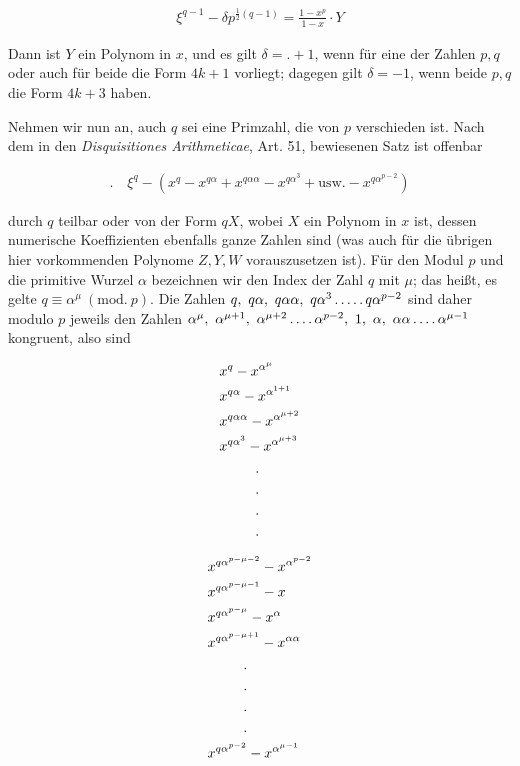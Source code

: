 \[
\begin{aligned}
\xi^{q-1}-\delta p^{\frac12(q-1)}=\frac{1-x^p}{1-x}\cdot Y
\end{aligned}
\]

Dann ist $Y$ ein Polynom in $x$, und es gilt $\delta=\mathord{.}+1$, wenn für eine der Zahlen $p,q$ oder auch für beide die Form $4k+1$ vorliegt; dagegen gilt $\delta=-1$, wenn beide $p,q$ die Form $4k+3$ haben.

\newpage
{}

Nehmen wir nun an, auch $q$ sei eine Primzahl, die von $p$ verschieden ist. Nach dem in den \textit{Disquisitiones Arithmeticae}, Art. 51, bewiesenen Satz ist offenbar

\[
\begin{aligned}
\mathord{.}\quad\xi^q-(x^q-x^{q\alpha}+x^{q\alpha\alpha}-x^{q\alpha^3}+\text{usw.}-x^{q\alpha^{p-2}})
\end{aligned}
\]

durch $q$ teilbar oder von der Form $qX$, wobei $X$ ein Polynom in $x$ ist, dessen numerische Koeffizienten ebenfalls ganze Zahlen sind (was auch für die übrigen hier vorkommenden Polynome $Z,Y,W$ vorauszusetzen ist). Für den Modul $p$ und die primitive Wurzel $\alpha$ bezeichnen wir den Index der Zahl $q$ mit $\mu$; das heißt, es gelte $q\equiv\alpha^\mu\ (\mathrm{mod.}\ p)$. Die Zahlen $q,\ q\alpha,\ q\alpha\alpha,\ q\alpha^3\dotsfive q\alpha^{p-2}$ sind daher modulo $p$ jeweils den Zahlen $\alpha^\mu,\allowbreak\ \alpha^{\mu+1},\allowbreak\ \alpha^{\mu+2}\dotsfour\alpha^{p-2},\allowbreak\ 1,\allowbreak\ \alpha,\allowbreak\ \alpha\alpha\dotsfour\alpha^{\mu-1}$ kongruent, also sind

\[
\begin{aligned}
&x^q-x^{\alpha^\mu}\\
&x^{q\alpha}-x^{\alpha^{1+1}}\\
&x^{q\alpha\alpha}-x^{\alpha^{\mu+2}}\\
&x^{q\alpha^3}-x^{\alpha^{\mu+3}}\\
&\hspace{9mm}\begin{gathered}.\\.\\.\\.\end{gathered}
\end{aligned}
\]

\[
\begin{aligned}
&x^{q\alpha^{p-\mu-2}}-x^{\alpha^{p-2}}\\
&x^{q\alpha^{p-\mu-1}}-x\\
&x^{q\alpha^{p-\mu}}-x^\alpha\\
&x^{q\alpha^{p-\mu+1}}-x^{\alpha\alpha}\\
&\hspace{9mm}\begin{gathered}.\\.\\.\\.\end{gathered}\\
&x^{q\alpha^{p-2}}-x^{\alpha^{\mu-1}}
\end{aligned}
\]

